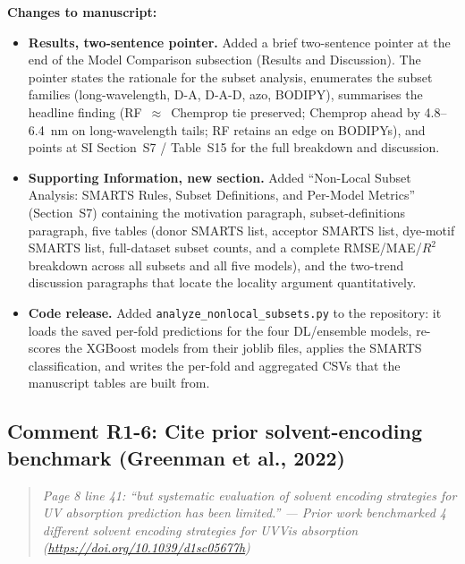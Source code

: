 \documentclass[11pt]{article}
\newenvironment{reviewer}{%
  \begin{quote}\itshape\color{black!70}}{%
  \end{quote}}
\newenvironment{changes}{%
  \noindent\textbf{Changes to manuscript:}
  \begin{itemize}[leftmargin=2em,itemsep=2pt]}{%
  \end{itemize}\medskip}
\begin{document}
\begin{changes}
  \item \textbf{Results, two-sentence pointer.} Added a brief two-sentence pointer at the end of the Model Comparison subsection (Results and Discussion). The pointer states the rationale for the subset analysis, enumerates the subset families (long-wavelength, D-A, D-A-D, azo, BODIPY), summarises the headline finding (RF~$\approx$~Chemprop tie preserved; Chemprop ahead by 4.8--6.4~nm on long-wavelength tails; RF retains an edge on BODIPYs), and points at SI Section~S7 / Table~S15 for the full breakdown and discussion.
  \item \textbf{Supporting Information, new section.} Added ``Non-Local Subset Analysis: SMARTS Rules, Subset Definitions, and Per-Model Metrics'' (Section~S7) containing the motivation paragraph, subset-definitions paragraph, five tables (donor SMARTS list, acceptor SMARTS list, dye-motif SMARTS list, full-dataset subset counts, and a complete RMSE/MAE/$R^2$ breakdown across all subsets and all five models), and the two-trend discussion paragraphs that locate the locality argument quantitatively.
  \item \textbf{Code release.} Added \texttt{analyze\_nonlocal\_subsets.py} to the repository: it loads the saved per-fold predictions for the four DL/ensemble models, re-scores the XGBoost models from their joblib files, applies the SMARTS classification, and writes the per-fold and aggregated CSVs that the manuscript tables are built from.
\end{changes}

\subsection*{Comment R1-6: Cite prior solvent-encoding benchmark (Greenman et al., 2022)}
\begin{reviewer}
Page 8 line 41: ``but systematic evaluation of solvent encoding strategies for UV absorption prediction has been limited.'' --- Prior work benchmarked 4 different solvent encoding strategies for UVVis absorption (\url{https://doi.org/10.1039/d1sc05677h})
\end{reviewer}
\end{document}
